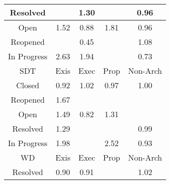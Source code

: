 \begin{tabular}{|c||c|c|c|c|}
\hline
Resolved &  & \cellcolor[rgb]{0.8691173715911431,0.8206345444379098,0.42} 1.30 &  & \cellcolor[rgb]{0.9010090912908998,0.7974430321102585,0.41160848520483967} 0.96 \\ 
\hline
Open & \cellcolor[rgb]{0.838630246669252,0.8061932747380667,0.41999999999999993} 1.52 & \cellcolor[rgb]{0.8822799240244721,0.7087916403825012,0.3941279290895073} 0.88 & \cellcolor[rgb]{0.7985520656385876,0.7872088731972257,0.42} 1.81 & \cellcolor[rgb]{0.9019962470225213,0.8021155692399339,0.41252983055435316} 0.96 \\ 
\hline
Reopened &  & \cellcolor[rgb]{0.787409472540703,0.2597381700259941,0.3055821743713228} 0.45 &  & \cellcolor[rgb]{0.8984265043636267,0.8345178178564547,0.42} 1.08 \\ 
\hline
In Progress & \cellcolor[rgb]{0.6854174428414634,0.7336187887143775,0.42} 2.63 & \cellcolor[rgb]{0.7806545116724037,0.7787310844764018,0.42000000000000004} 1.94 &  & \cellcolor[rgb]{0.8497430791741942,0.5547839080911859,0.36376020722924796} 0.73 \\ 
\hline
\hline
SDT & Exis & Exec & Prop & Non-Arch \\ 
\hline
Closed & \cellcolor[rgb]{0.8930794951538717,0.7599096103949932,0.4042075288102803} 0.92 & \cellcolor[rgb]{0.9078304896601287,0.8389723372074294,0.42} 1.02 & \cellcolor[rgb]{0.9033358466568288,0.8084563408423228,0.4137801235463735} 0.97 & \cellcolor[rgb]{0.9097818591919348,0.8398966701435481,0.42} 1.00 \\ 
\hline
Reopened & \cellcolor[rgb]{0.8181213860705133,0.7964785512965589,0.42} 1.67 &  &  &  \\ 
\hline
Open & \cellcolor[rgb]{0.8420345242712346,0.8078058272863743,0.42000000000000004} 1.49 & \cellcolor[rgb]{0.8688696893483527,0.6453165295822031,0.3816117100584626} 0.82 & \cellcolor[rgb]{0.866789509296186,0.8195318728245092,0.42} 1.31 &  \\ 
\hline
Resolved & \cellcolor[rgb]{0.8704972310061799,0.8212881620555588,0.42} 1.29 &  &  & \cellcolor[rgb]{0.9072803670430413,0.827127070670395,0.41746167590683847} 0.99 \\ 
\hline
In Progress & \cellcolor[rgb]{0.7745431522474526,0.7758362300119512,0.42} 1.98 &  & \cellcolor[rgb]{0.7010026478624296,0.7410012542506245,0.42} 2.52 & \cellcolor[rgb]{0.8947854989783505,0.7679846951641919,0.40579979904646035} 0.93 \\ 
\hline
\hline
WD & Exis & Exec & Prop & Non-Arch \\ 
\hline
Resolved & \cellcolor[rgb]{0.887372909995395,0.7328984406448698,0.39888138266236867} 0.90 & \cellcolor[rgb]{0.8889302140999521,0.7402696800731067,0.40033486649328864} 0.91 &  & \cellcolor[rgb]{0.9074655533879991,0.8387994726574731,0.42} 1.02 \\ 

\end{tabular}
